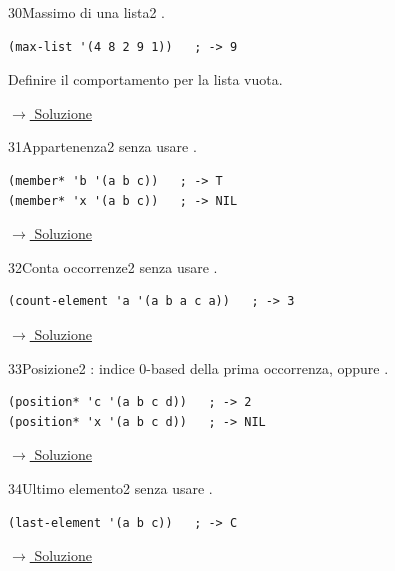 \label{ex:30}
\begin{colbox}{30}{Massimo di una lista}{2}
 .
\nopagebreak
\begin{lstlisting}
(max-list '(4 8 2 9 1))   ; -> 9
\end{lstlisting}
Definire il comportamento per la lista vuota.


\small\color{black!55}\hyperref[sol:30]{$\rightarrow$ Soluzione}\normalsize\color{black}
\end{colbox}

\label{ex:31}
\begin{essbox}{31}{Appartenenza}{2}
  senza usare .
\nopagebreak
\begin{lstlisting}
(member* 'b '(a b c))   ; -> T
(member* 'x '(a b c))   ; -> NIL
\end{lstlisting}


\small\color{black!55}\hyperref[sol:31]{$\rightarrow$ Soluzione}\normalsize\color{black}
\end{essbox}

\label{ex:32}
\begin{stdbox}{32}{Conta occorrenze}{2}
  senza usare .
\nopagebreak
\begin{lstlisting}
(count-element 'a '(a b a c a))   ; -> 3
\end{lstlisting}


\small\color{black!55}\hyperref[sol:32]{$\rightarrow$ Soluzione}\normalsize\color{black}
\end{stdbox}

\label{ex:33}
\begin{colbox}{33}{Posizione}{2}
 : indice 0-based
della prima occorrenza, oppure .
\begin{lstlisting}
(position* 'c '(a b c d))   ; -> 2
(position* 'x '(a b c d))   ; -> NIL
\end{lstlisting}


\small\color{black!55}\hyperref[sol:33]{$\rightarrow$ Soluzione}\normalsize\color{black}
\end{colbox}

\label{ex:34}
\begin{colbox}{34}{Ultimo elemento}{2}
  senza usare .
\nopagebreak
\begin{lstlisting}
(last-element '(a b c))   ; -> C
\end{lstlisting}


\small\color{black!55}\hyperref[sol:34]{$\rightarrow$ Soluzione}\normalsize\color{black}
\end{colbox}

